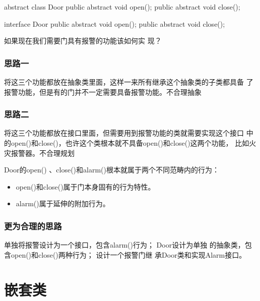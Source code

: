 \begin{javaCode}
  abstract class Door {
    public abstract void open();
    public abstract void close();
  }
\end{javaCode}

\begin{javaCode}
  interface Door {
    public abstract void open();
    public abstract void close();
  }
\end{javaCode}

 如果现在我们需要门具有报警的功能该如何实
现？

\subsubsection{思路一} 
  
将这三个功能都放在抽象类里面，这样一来所有继承这个抽象类的子类都具备
了报警功能，但是有的门并不一定需要具备报警功能。{\hei\Red 不合理抽象}

  
\subsubsection{思路二} 

将这三个功能都放在接口里面，但需要用到报警功能的类就需要实现这个接口
中的open()和close()，也许这个类根本就不具备open()和close()这两个功能，
比如火灾报警器。{\hei\Red 不合理规划}

Door的open() 、close()和alarm()根本就属于两个不同范畴内的行为：

\begin{itemize}
\item open()和close()属于门本身固有的行为特性。
\item alarm()属于延伸的附加行为。
\end{itemize}

\subsubsection{更为合理的思路} 

 单独将报警设计为一个接口，包含alarm()行为； Door设计为单独
的抽象类，包含open()和close()两种行为； 设计一个报警门继
承Door类和实现Alarm接口。


\section{嵌套类}


